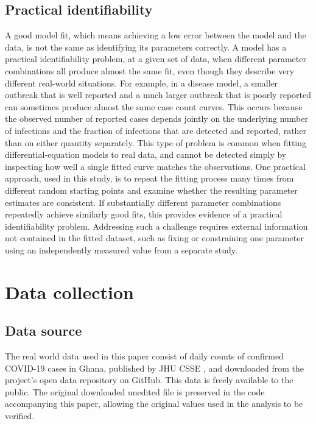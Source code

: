 \documentclass[journal]{IEEEtran}
\begin{document}
\subsection{Practical identifiability}

A good model fit, which means achieving a low error between the model and the data, is not the same as identifying its parameters correctly. A model has a practical identifiability problem, at a given set of data, when different parameter combinations all produce almost the same fit, even though they describe very different real-world situations. For example, in a disease model, a smaller outbreak that is well reported and a much larger outbreak that is poorly reported can sometimes produce almost the same case count curves. This occurs because the observed number of reported cases depends jointly on the underlying number of infections and the fraction of infections that are detected and reported, rather than on either quantity separately. This type of problem is common when fitting differential-equation models to real data, and cannot be detected simply by inspecting how well a single fitted curve matches the observations. One practical approach, used in this study, is to repeat the fitting process many times from different random starting points and examine whether the resulting parameter estimates are consistent. If substantially different parameter combinations repeatedly achieve similarly good
fits, this provides evidence of a practical identifiability problem. Addressing such a challenge requires external information not contained in the fitted dataset, such as fixing or constraining one parameter using an independently measured value from a separate study.

\section{Data collection}

\subsection{Data source}

The real world data used in this paper consist of daily counts of confirmed COVID-19 cases in Ghana, published by JHU CSSE \cite{dong2020}, and downloaded from the project's open data repository on GitHub. This data is freely available to the public. The original downloaded unedited file is preserved in the code accompanying this paper, allowing the original values used in the analysis to be verified.
\end{document}

